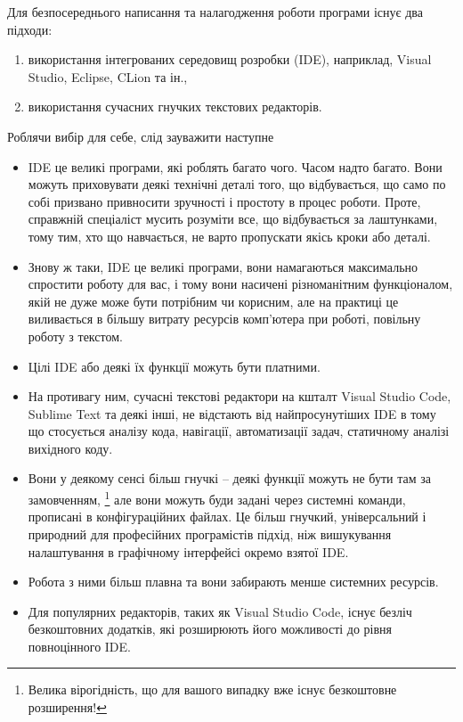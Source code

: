 \documentclass[12pt]{article}
\begin{document}
	Для безпосереднього написання та налагодження роботи програми існує два підходи:
	\begin{enumerate}[(а)]
		\item використання інтегрованих середовищ розробки (IDE), наприклад, Visual Studio, Eclipse, CLion та ін.,
		\item використання сучасних гнучких текстових редакторів.
	\end{enumerate}

	Роблячи вибір для себе, слід зауважити наступне
	\begin{itemize}
		\item IDE це великі програми, які роблять багато чого. Часом надто багато. Вони можуть приховувати деякі технічні деталі того, що відбувається, що само по собі призвано привносити зручності і простоту в процес роботи. Проте, справжній спеціаліст мусить розуміти все, що відбувається за лаштунками, тому тим, хто що навчається, не варто пропускати якісь кроки або деталі.
		\item Знову ж таки, IDE це великі програми, вони намагаються максимально спростити роботу для вас, і тому вони насичені різноманітним функціоналом, якій не дуже може бути потрібним чи корисним, але на практиці це виливається в більшу витрату ресурсів комп'ютера при роботі, повільну роботу з текстом.
		\item Цілі IDE або деякі їх функції можуть бути платними.
		\item На противагу ним, сучасні текстові редактори на кшталт Visual Studio Code, Sublime Text та деякі інші, не відстають від найпросунутіших IDE в тому що стосується аналізу кода, навігації, автоматизації задач, статичному аналізі вихідного коду.
		\item Вони у деякому сенсі більш гнучкі -- деякі функції можуть не бути там за замовченням, \footnote{Велика вірогідність, що для вашого випадку вже існує безкоштовне розширення!} але вони можуть буди задані через системні команди, прописані в конфігураційних файлах. Це більш гнучкий, універсальний і природний для професійних програмістів підхід, ніж вишукування налаштування в графічному інтерфейсі окремо взятої IDE.
		\item Робота з ними більш плавна та вони забирають менше системних ресурсів.
		\item Для популярних редакторів, таких як Visual Studio Code, існує безліч безкоштовних додатків, які розширюють його можливості до рівня повноцінного IDE.
	\end{itemize}
\end{document}
